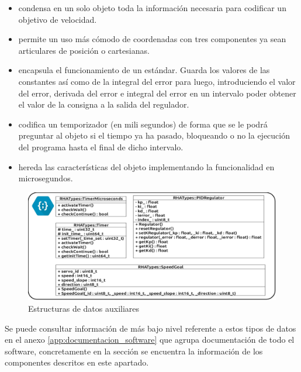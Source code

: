         \begin{itemize}
            \item {} condensa en un solo objeto toda la información necesaria para codificar un objetivo de velocidad.
            \item {} permite un uso más cómodo de coordenadas con tres componentes ya sean articulares de posición o cartesianas.
            \item {} encapsula el funcionamiento de un  estándar. Guarda los valores de las constantes así como de la integral del error para luego, introduciendo el valor del error, derivada del error e integral del error en un intervalo poder obtener el valor de la consigna a la salida del regulador.
            \item {} codifica un temporizador (en mili segundos) de forma que se le podrá preguntar al objeto si el tiempo ya ha pasado, bloqueando o no la ejecución del programa hasta el final de dicho intervalo.
            \item {} hereda las características del objeto  implementando la funcionalidad en microsegundos.
        \end{itemize}

        \begin{figure}[H]
            \centering
            \includegraphics[width=1\textwidth]{figuras/Imagenes_SW/class_diagram_TRHA.jpg}
            \caption{Estructuras de datos auxiliares}
            \label{fig:SW:class_diagram_TRHA}
        \end{figure}

        Se puede consultar información de más bajo nivel referente a estos tipos de datos en el anexo \ref{app:documentacion_software} que agrupa documentación de todo el software, concretamente en la sección \completar se encuentra la información de los componentes descritos en este apartado.

